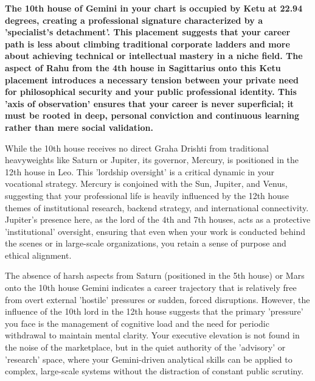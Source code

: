 {\fontsize{9.5}{13.8}\selectfont\bfseries\color{DeepSlate} The 10th house of Gemini in your chart is occupied by Ketu at 22.94 degrees, creating a professional signature characterized by a 'specialist's detachment'. This placement suggests that your career path is less about climbing traditional corporate ladders and more about achieving technical or intellectual mastery in a niche field. The aspect of Rahu from the 4th house in Sagittarius onto this Ketu placement introduces a necessary tension between your private need for philosophical security and your public professional identity. This 'axis of observation' ensures that your career is never superficial; it must be rooted in deep, personal conviction and continuous learning rather than mere social validation.}\par\vspace{2mm}

{\fontsize{9}{13}\selectfont While the 10th house receives no direct Graha Drishti from traditional heavyweights like Saturn or Jupiter, its governor, Mercury, is positioned in the 12th house in Leo. This 'lordship oversight' is a critical dynamic in your vocational strategy. Mercury is conjoined with the Sun, Jupiter, and Venus, suggesting that your professional life is heavily influenced by the 12th house themes of institutional research, backend strategy, and international connectivity. Jupiter's presence here, as the lord of the 4th and 7th houses, acts as a protective 'institutional' oversight, ensuring that even when your work is conducted behind the scenes or in large-scale organizations, you retain a sense of purpose and ethical alignment.}\par\vspace{1.8mm}

{\fontsize{9}{13}\selectfont The absence of harsh aspects from Saturn (positioned in the 5th house) or Mars onto the 10th house Gemini indicates a career trajectory that is relatively free from overt external 'hostile' pressures or sudden, forced disruptions. However, the influence of the 10th lord in the 12th house suggests that the primary 'pressure' you face is the management of cognitive load and the need for periodic withdrawal to maintain mental clarity. Your executive elevation is not found in the noise of the marketplace, but in the quiet authority of the 'advisory' or 'research' space, where your Gemini-driven analytical skills can be applied to complex, large-scale systems without the distraction of constant public scrutiny.}\par\vspace{1.8mm}

